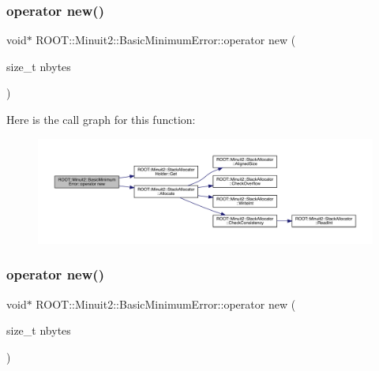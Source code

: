 \subsubsection{\texorpdfstring{operator new()}{operator new()}\hspace{0.1cm}{\footnotesize\ttfamily [1/2]}}
{\footnotesize\ttfamily void$\ast$ R\+O\+O\+T\+::\+Minuit2\+::\+Basic\+Minimum\+Error\+::operator new (\begin{DoxyParamCaption}\item[{size\+\_\+t}]{nbytes }\end{DoxyParamCaption})\hspace{0.3cm}{\ttfamily [inline]}}

Here is the call graph for this function\+:
\nopagebreak
\begin{figure}[H]
\begin{center}
\leavevmode
\includegraphics[width=350pt]{d9/ddd/classROOT_1_1Minuit2_1_1BasicMinimumError_a722b14848c4cb4144f4ba7cdf90e5ef3_cgraph}
\end{center}
\end{figure}
\mbox{\label{classROOT_1_1Minuit2_1_1BasicMinimumError_a722b14848c4cb4144f4ba7cdf90e5ef3}} 
\subsubsection{\texorpdfstring{operator new()}{operator new()}\hspace{0.1cm}{\footnotesize\ttfamily [2/2]}}
{\footnotesize\ttfamily void$\ast$ R\+O\+O\+T\+::\+Minuit2\+::\+Basic\+Minimum\+Error\+::operator new (\begin{DoxyParamCaption}\item[{size\+\_\+t}]{nbytes }\end{DoxyParamCaption})\hspace{0.3cm}{\ttfamily [inline]}}

